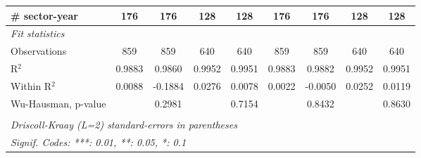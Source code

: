 \documentclass[a4paper]{article}
\begin{document}
\begin{table}[h!]
{\begin{tabular}{lcccccccc}
      \# sector-year                                 & 176            & 176                    & 128            & 128                    & 176          & 176                    & 128            & 128\\  
            \midrule
      \emph{Fit statistics}\\
      Observations                                   & 859            & 859                    & 640            & 640                    & 859          & 859                    & 640            & 640\\  
      R$^2$                                          & 0.9883         & 0.9860                 & 0.9952         & 0.9951                 & 0.9883       & 0.9882                 & 0.9952         & 0.9951\\  
      Within R$^2$                                   & 0.0088         & -0.1884                & 0.0276         & 0.0078                 & 0.0022       & -0.0050                & 0.0252         & 0.0119\\  
      Wu-Hausman, p-value                            &                & 0.2981                 &                & 0.7154                 &              & 0.8432                 &                & 0.8630\\ 
      \bottomrule \\ [-0.9em]
      \multicolumn{9}{l}{\emph{Driscoll-Kraay (L=2) standard-errors in parentheses}}\\
      \multicolumn{9}{l}{\emph{Signif. Codes: ***: 0.01, **: 0.05, *: 0.1}}\\
   \end{tabular}
   }
\end{table}
\FloatBarrier
\end{document}
